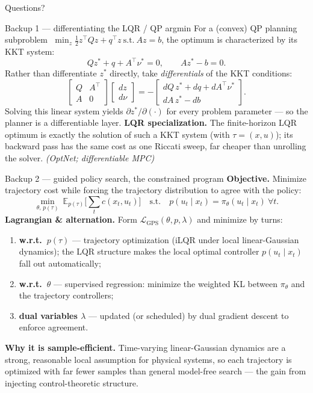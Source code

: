 \documentclass[10pt, aspectratio=169]{beamer}
\newcommand{\paper}[1]{\textcolor{mLightBrown}{\small\textit{(#1)}}}
\begin{document}
\begin{frame}[standout]
Questions?
\end{frame}

\appendix

\begin{frame}{Backup 1 --- differentiating the LQR / QP argmin}
\footnotesize
For a (convex) QP planning subproblem $\;\min_z \tfrac12 z^\top Q z + q^\top z\ \text{s.t.}\ Az = b$, the optimum is characterized by its KKT system:
\[
Q z^* + q + A^\top \nu^* = 0, \qquad A z^* - b = 0.
\]
Rather than differentiate $z^*$ directly, take \emph{differentials} of the KKT conditions:
\[
\begin{bmatrix} Q & A^\top \\ A & 0 \end{bmatrix}\begin{bmatrix} dz \\ d\nu \end{bmatrix} = -\begin{bmatrix} dQ\,z^* + dq + dA^\top \nu^* \\ dA\,z^* - db \end{bmatrix}.
\]
Solving this linear system yields $\partial z^*/\partial(\cdot)$ for every problem parameter --- so the planner is a differentiable layer. \textbf{LQR specialization.} The finite-horizon LQR optimum is exactly the solution of such a KKT system (with $\tau=(x,u)$); its backward pass has the same cost as one Riccati sweep, far cheaper than unrolling the solver. \paper{OptNet; differentiable MPC}
\end{frame}

\begin{frame}{Backup 2 --- guided policy search, the constrained program}
\footnotesize
\textbf{Objective.} Minimize trajectory cost while forcing the trajectory distribution to agree with the policy:
\[
\min_{\theta,\,p(\tau)} \ \mathbb{E}_{p(\tau)}\Big[\textstyle\sum_t c(x_t,u_t)\Big] \quad\text{s.t.}\quad p(u_t\mid x_t) = \pi_\theta(u_t\mid x_t)\ \forall t.
\]
\textbf{Lagrangian \& alternation.} Form $\mathcal{L}_{\text{GPS}}(\theta, p, \lambda)$ and minimize by turns:
\begin{enumerate}\setlength\itemsep{1pt}
\item \textbf{w.r.t.\ $p(\tau)$} --- trajectory optimization (iLQR under local linear-Gaussian dynamics); the LQR structure makes the local optimal controller $p(u_t\mid x_t)$ fall out automatically;
\item \textbf{w.r.t.\ $\theta$} --- supervised regression: minimize the weighted KL between $\pi_\theta$ and the trajectory controllers;
\item \textbf{dual variables $\lambda$} --- updated (or scheduled) by dual gradient descent to enforce agreement.
\end{enumerate}
\medskip
\textbf{Why it is sample-efficient.} Time-varying linear-Gaussian dynamics are a strong, reasonable local assumption for physical systems, so each trajectory is optimized with far fewer samples than general model-free search --- the gain from injecting control-theoretic structure.
\end{frame}
\end{document}
